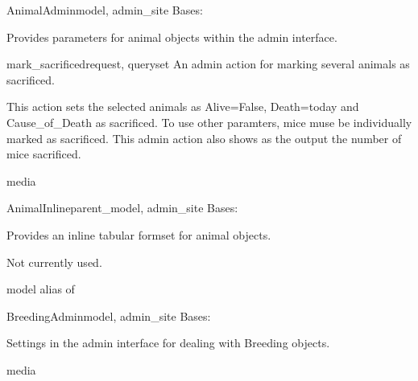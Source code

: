 \documentclass[letterpaper,10pt,english]{sphinxmanual}
\begin{document}
\hypertarget{animal.admin.AnimalAdmin}{}\begin{classdesc}{AnimalAdmin}{model, admin\_site}
Bases: 

Provides parameters for animal objects within the admin interface.

\hypertarget{animal.admin.AnimalAdmin.mark\_sacrificed}{}\begin{methoddesc}{mark\_sacrificed}{request, queryset}
An admin action for marking several animals as sacrificed.

This action sets the selected animals as Alive=False, Death=today and Cause\_of\_Death as sacrificed.  To use other paramters, mice muse be individually marked as sacrificed.
This admin action also shows as the output the number of mice sacrificed.
\end{methoddesc}

\hypertarget{animal.admin.AnimalAdmin.media}{}\begin{memberdesc}{media}\end{memberdesc}
\end{classdesc}

\hypertarget{animal.admin.AnimalInline}{}\begin{classdesc}{AnimalInline}{parent\_model, admin\_site}
Bases: 

Provides an inline tabular formset for animal objects.

Not currently used.

\hypertarget{animal.admin.AnimalInline.model}{}\begin{memberdesc}{model}
alias of 
\end{memberdesc}
\end{classdesc}

\hypertarget{animal.admin.BreedingAdmin}{}\begin{classdesc}{BreedingAdmin}{model, admin\_site}
Bases: 

Settings in the admin interface for dealing with Breeding objects.

\hypertarget{animal.admin.BreedingAdmin.media}{}\begin{memberdesc}{media}\end{memberdesc}
\end{classdesc}
\end{document}

